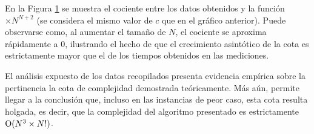             En la Figura \ref{fig:exp3:part_tiempo_sobre_exp} se muestra el cociente entre los datos obtenidos y la función $\times N^{N + 2}$ (se considera el mismo valor de $c$ que en el gráfico anterior). Puede observarse como, al aumentar el tamaño de $N$, el cociente se aproxima rápidamente a $0$, ilustrando el hecho de que el crecimiento asintótico de la cota es estrictamente mayor que el de los tiempos obtenidos en las mediciones.

            \begin{figure}[H]
                \centering
                \caption{}
                \label{fig:exp3:part_tiempo_sobre_exp}
            \end{figure}

            El análisis expuesto de los datos recopilados presenta evidencia empírica sobre la pertinencia la cota de complejidad demostrada teóricamente. Más aún, permite llegar a la conclusión que, incluso en las instancias de peor caso, esta cota resulta holgada, es decir, que la complejidad del algoritmo presentado es estrictamente $\operatorname{O}(N^3 \times N!)$.

